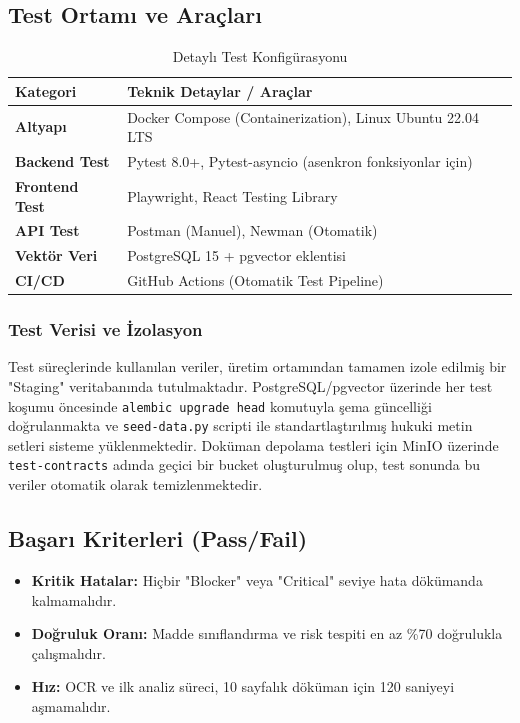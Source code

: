 \documentclass[12pt,a4paper]{article}
\begin{document}
\subsection{Test Ortamı ve Araçları}
\begin{table}[h!]
\centering
\caption{Detaylı Test Konfigürasyonu}
\vspace{0.3cm}
\begin{tabular}{@{}ll@{}}
\toprule
\textbf{Kategori} & \textbf{Teknik Detaylar / Araçlar} \\ \midrule
\textbf{Altyapı} & Docker Compose (Containerization), Linux Ubuntu 22.04 LTS \\
\textbf{Backend Test} & Pytest 8.0+, Pytest-asyncio (asenkron fonksiyonlar için) \\
\textbf{Frontend Test} & Playwright, React Testing Library \\
\textbf{API Test} & Postman (Manuel), Newman (Otomatik) \\
\textbf{Vektör Veri} & PostgreSQL 15 + pgvector eklentisi \\

\textbf{CI/CD} & GitHub Actions (Otomatik Test Pipeline) \\
\bottomrule
\end{tabular}
\end{table}

\subsubsection{Test Verisi ve İzolasyon}
Test süreçlerinde kullanılan veriler, üretim ortamından tamamen izole edilmiş bir "Staging" veritabanında tutulmaktadır. PostgreSQL/pgvector üzerinde her test koşumu öncesinde \texttt{alembic upgrade head} komutuyla şema güncelliği doğrulanmakta ve \texttt{seed-data.py} scripti ile standartlaştırılmış hukuki metin setleri sisteme yüklenmektedir. Doküman depolama testleri için MinIO üzerinde \texttt{test-contracts} adında geçici bir bucket oluşturulmuş olup, test sonunda bu veriler otomatik olarak temizlenmektedir.

\subsection{Başarı Kriterleri (Pass/Fail)}
\begin{itemize}
    \item \textbf{Kritik Hatalar:} Hiçbir "Blocker" veya "Critical" seviye hata dökümanda kalmamalıdır.
    \item \textbf{Doğruluk Oranı:} Madde sınıflandırma ve risk tespiti en az \%70 doğrulukla çalışmalıdır.
    \item \textbf{Hız:} OCR ve ilk analiz süreci, 10 sayfalık döküman için 120 saniyeyi aşmamalıdır.
\end{itemize}
\end{document}
